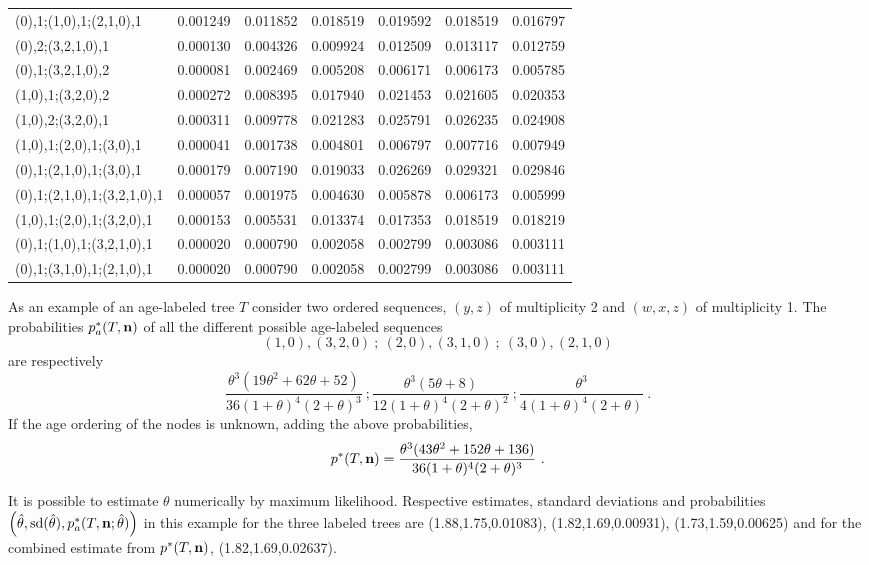 \begin{small}
\begin{tabular}{lllllll}
(0),1;(1,0),1;(2,1,0),1
                  &0.001249 &0.011852 &0.018519 &0.019592 &0.018519 &0.016797 \\
(0),2;(3,2,1,0),1 &0.000130 &0.004326 &0.009924 &0.012509 &0.013117 &0.012759 \\
(0),1;(3,2,1,0),2 &0.000081 &0.002469 &0.005208 &0.006171 &0.006173 &0.005785 \\
(1,0),1;(3,2,0),2 &0.000272 &0.008395 &0.017940 &0.021453 &0.021605 &0.020353 \\
(1,0),2;(3,2,0),1 &0.000311 &0.009778 &0.021283 &0.025791 &0.026235 &0.024908 \\
(1,0),1;(2,0),1;(3,0),1
                  &0.000041 &0.001738 &0.004801 &0.006797 &0.007716 &0.007949 \\
(0),1;(2,1,0),1;(3,0),1
                  &0.000179 &0.007190 &0.019033 &0.026269 &0.029321 &0.029846 \\
(0),1;(2,1,0),1;(3,2,1,0),1
                  &0.000057 &0.001975 &0.004630 &0.005878 &0.006173 &0.005999 \\
(1,0),1;(2,0),1;(3,2,0),1
                  &0.000153 &0.005531 &0.013374 &0.017353 &0.018519 &0.018219 \\(0),1;(1,0),1;(3,2,1,0),1
                  &0.000020 &0.000790 &0.002058 &0.002799 &0.003086 &0.003111 \\
(0),1;(3,1,0),1;(2,1,0),1
                  &0.000020 &0.000790 &0.002058 &0.002799 &0.003086 &0.003111
\end{tabular}
\end{small}
\vspace{0.5cm}

    As an example of an age-labeled tree $T$
consider two ordered sequences, $(y,z)$ of multiplicity
2 and $(w,x,z)$ of multiplicity 1.
The probabilities $p_a^*(T,{\bf  n})$ of all the different possible 
age-labeled sequences\\ 
$$(1,0),(3,2,0)~;~(2,0),(3,1,0)~;~(3,0),(2,1,0)$$
are respectively
$$\frac{\theta^3(19\theta^2+62\theta + 52)}{36(1+\theta )^4(2+\theta )^3}~; 
\frac{\theta^3(5\theta + 8)}{12(1+\theta )^4(2 + \theta )^2}~;
\frac{\theta^3}{4(1+\theta )^4(2 + \theta )}~.$$
If the age ordering of the nodes is unknown, adding the above probabilities,
$$p^*(T,{\bf n}) = \frac{\theta^3(43\theta^2 + 152\theta + 136)}
{36(1 + \theta )^4(2 + \theta )^3}~.$$

    It is possible to estimate $\theta$ numerically by maximum likelihood.
Respective estimates, standard deviations and probabilities 
$\left (\hat{\theta }, {\rm sd}(\hat{\theta }), 
p_a^*(T,{\bf n};\hat{\theta })\right )$ in this example
for the three labeled trees are (1.88,1.75,0.01083), (1.82,1.69,0.00931),
(1.73,1.59,0.00625) and for the combined estimate from $p^*(T,{\bf n})$, 
 (1.82,1.69,0.02637).

